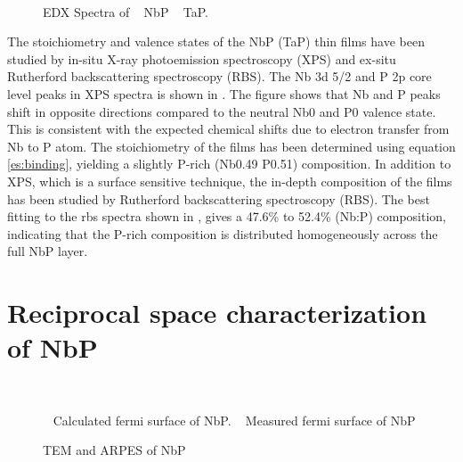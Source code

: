 \begin{figure}
    \centering
    \\
    \caption{
        EDX Spectra of
        \sfA~ NbP
        \sfB~ TaP.
    }
\end{figure}

The stoichiometry and valence states of the NbP (TaP) thin films have
been studied by in-situ X-ray photoemission spectroscopy (XPS) and ex-situ 
Rutherford backscattering spectroscopy (RBS).  The Nb 3d 5/2 and P 2p core 
level peaks in XPS spectra is shown in . The figure shows that Nb 
and P peaks shift in opposite directions compared to the neutral Nb0 and P0 
valence state. This is consistent with the expected chemical shifts due to 
electron transfer from Nb to P atom. The stoichiometry  of the films has been 
determined using equation \cref{es:binding}, yielding a slightly P-rich 
(Nb0.49 P0.51) composition. In addition to XPS, which is a surface sensitive technique,
the in-depth composition of the films has been studied by Rutherford backscattering 
spectroscopy (RBS). The best fitting to the rbs spectra shown in , gives a 
47.6\% to 52.4\% (Nb:P) composition, indicating that the P-rich composition 
is distributed homogeneously across the full NbP layer.

\section{Reciprocal space characterization of NbP}

\begin{figure}
    \centering
    \\
    \caption{
        \sfA~ Calculated fermi surface of NbP.
        \sfB~ Measured fermi surface of NbP
    }
\end{figure}

\begin{figure}
    \centering

    
    \caption{
       TEM and ARPES of NbP
    }
\end{figure}

